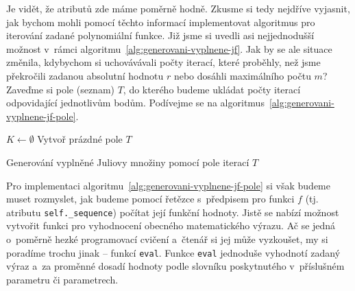 Je vidět, že atributů zde máme poměrně hodně. Zkusme si tedy nejdříve vyjasnit, jak bychom mohli pomocí těchto informací implementovat algoritmus pro iterování zadané polynomiální funkce. Již jsme si uvedli asi nejjednodušší možnost v~rámci algoritmu~\ref{alg:generovani-vyplnene-jf}. Jak by se ale situace změnila, kdybychom si uchovávávali počty iterací, které proběhly, než jsme překročili zadanou absolutní hodnotu $r$ nebo dosáhli maximálního počtu $m$? Zaveďme si pole (seznam) $T$, do kterého budeme ukládat počty iterací odpovidající jednotlivům bodům. Podívejme se na algoritmus~\ref{alg:generovani-vyplnene-jf-pole}.
\begin{algorithm}[h]
    $K\gets\emptyset$\;
    Vytvoř prázdné pole $T$\;
    \;
    \caption{Generování vyplněné Juliovy množiny pomocí pole iterací $T$}
    \label{alg:generovani-vyplnene-jf-pole}
\end{algorithm}
Pro implementaci algoritmu~\ref{alg:generovani-vyplnene-jf-pole} si však budeme muset rozmyslet, jak budeme pomocí řetězce s~předpisem pro funkci $f$ (tj. atributu \texttt{self.\_sequence}) počítat její funkční hodnoty. Jistě se nabízí možnost vytvořit funkci pro vyhodnocení obecného matematického výrazu. Ač se jedná o~poměrně hezké programovací cvičení a~čtenář si jej může vyzkoušet, my si poradíme trochu jinak -- funkcí \texttt{eval}. Funkce \texttt{eval} jednoduše vyhodnotí zadaný výraz a~za proměnné dosadí hodnoty podle slovníku poskytnutého v~příslušném parametru či parametrech.

